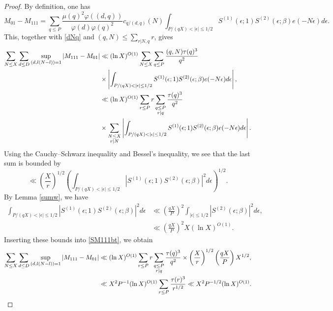 \documentclass{amsart}
\theoremstyle{definition}
\theoremstyle{remark}
\newcommand{\1}{
    \bm{1}
}
\begin{document}
\begin{proof}
By definition, one has
\[ M_{01} - M_{111} = \sum_{q \leq P} \frac{\mu(q)^2 \varphi((d,q))}{\varphi(d) \varphi(q)^2} c_{q/(d,q)}(N) \int_{P/(qX)<|\epsilon| \leq 1/2} S^{(1)}(\epsilon;1) S^{(2)}(\epsilon;\beta) e(-N\epsilon) d\epsilon. \]
This, together with \eqref{dNq} and $(q,N) \leq \sum_{r|N,q} r$, gives
\begin{align}
\sum_{N \leq X} \sum_{d \leq D} \sup_{(d,l(N-l))=1} |M_{111}-M_{01}| &\ll (\ln{X})^{O(1)} \sum_{N \leq X} \sum_{q \leq P} \frac{(q,N) \tau(q)^3}{q^2} \notag \\
& \times \left| \int_{P/(qX)<|\epsilon| \leq 1/2} S^{(1)}(\epsilon;1) S^{(2)}(\epsilon;\beta) e(-N\epsilon) d\epsilon \right|, \notag \\
&\ll (\ln{X})^{O(1)} \sum_{r \leq P} r \sum_{\substack{q \leq P \\ r|q}} \frac{\tau(q)^3}{q^2} \notag \\
& \times \sum_{\substack{N \leq X \\ r|N}} \left| \int_{P/(qX)<|\epsilon| \leq 1/2} S^{(1)}(\epsilon;1) S^{(2)}(\epsilon;\beta) e(-N\epsilon) d\epsilon \right|. \label{SM111bt}
\end{align}
Using the Cauchy--Schwarz inequality and Bessel's inequality, we see that the last sum is bounded by
\[ \ll \left( \frac{X}{r} \right)^{1/2} \left( \int_{P/(qX)<|\epsilon| \leq 1/2} |S^{(1)}(\epsilon;1) S^{(2)}(\epsilon;\beta)|^2 d\epsilon \right)^{1/2}. \]
By Lemma \ref{sumw}, we have
\begin{align*}
\int_{P/(qX)<|\epsilon| \leq 1/2} |S^{(1)}(\epsilon;1) S^{(2)}(\epsilon;\beta)|^2 d\epsilon &\ll \left( \frac{qX}{P} \right)^2 \int_{|\epsilon| \leq 1/2} |S^{(2)}(\epsilon;\beta)|^2 d\epsilon, \\
&\ll \left( \frac{qX}{P} \right)^2  X (\ln{X})^{O(1)}.
\end{align*}
Inserting these bounds into \eqref{SM111bt}, we obtain
\begin{align}
\sum_{N \leq X} \sum_{d \leq D} \sup_{(d,l(N-l))=1} |M_{111}-M_{01}| &\ll (\ln{X})^{O(1)} \sum_{r \leq P} r \sum_{\substack{q \leq P \\ r|q}} \frac{\tau(q)^3}{q^2} \times \left( \frac{X}{r} \right)^{1/2} \left( \frac{qX}{P} \right) X^{1/2}, \notag \\
&\ll X^2 P^{-1} (\ln{X})^{O(1)} \sum_{r \leq P} \frac{\tau(r)^3}{r^{1/2}} \ll X^2 P^{-1/2} (\ln{X})^{O(1)}. \label{SM111b}
\end{align}






\end{proof}
\end{document}
